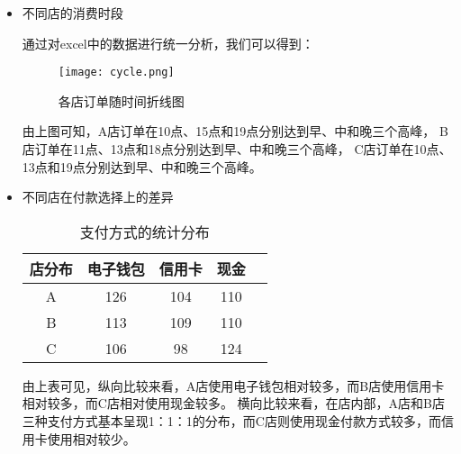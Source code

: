 \documentclass[withoutpreface,bwprint]{cumcmthesis}
\begin{document}
\begin{itemize}[itemindent=2em]
\item 不同店的消费时段
\par
通过对excel中的数据进行统一分析，我们可以得到：
\begin{figure}[H]
\centering
\texttt{[image: cycle.png]}
\caption{各店订单随时间折线图}
\label{fig:单图}
\end{figure}

由上图可知，A店订单在10点、15点和19点分别达到早、中和晚三个高峰，
B店订单在11点、13点和18点分别达到早、中和晚三个高峰，
C店订单在10点、13点和19点分别达到早、中和晚三个高峰。
\item 不同店在付款选择上的差异
\par
\begin{table}[H]
    \caption{支付方式的统计分布}%
    \centering
    \fontsize{12}{14}\selectfont   
    \begin{tabular}{ccccc}
        \toprule[1.5pt]
        店分布 & 电子钱包 & 信用卡 & 现金 \\
        \midrule[1pt]
        A & 126 &104 & 110 \\
        B & 113 & 109 & 110 \\
        C & 106 & 98 & 124 \\
        \bottomrule[1.5pt]
    \end{tabular}
\end{table}

由上表可见，纵向比较来看，A店使用电子钱包相对较多，而B店使用信用卡相对较多，而C店相对使用现金较多。
横向比较来看，在店内部，A店和B店三种支付方式基本呈现1：1：1的分布，而C店则使用现金付款方式较多，而信用卡使用相对较少。


\end{itemize}
\end{document}
